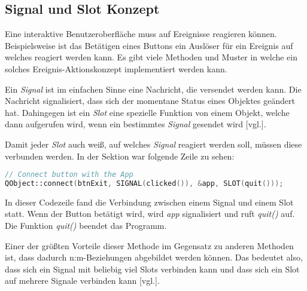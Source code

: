 \subsection{Signal und Slot Konzept}
\label{subsec:signalslot}
Eine interaktive Benutzeroberfläche muss auf
Ereignisse reagieren können. Beispielsweise ist das Betätigen eines Buttons ein Auslöser für ein
Ereignis auf welches reagiert werden kann. Es gibt viele Methoden und Muster in welche ein
solches Ereignis-Aktionskonzept implementiert werden kann.

Ein \emph{Signal} ist im einfachen Sinne eine Nachricht, die versendet werden kann. Die Nachricht
signalisiert, dass sich der momentane Status eines Objektes geändert hat. Dahingegen ist ein
\emph{Slot} eine spezielle Funktion von einem Objekt, welche dann aufgerufen wird, wenn ein
bestimmtes \emph{Signal} gesendet wird \cite{GettingStartedQt}[vgl.].

Damit jeder \emph{Slot} auch weiß, auf welches \emph{Signal} reagiert werden soll, müssen diese verbunden werden. In der Sektion \emph{} war
folgende Zeile zu sehen:
\newpage
\begin{lstlisting}[language=C++, caption=Signal- und Slot-Beispiel, label=lst:SignalSlotBeispiel]
// Connect button with the App
QObject::connect(btnExit, SIGNAL(clicked()), &app, SLOT(quit()));

\end{lstlisting}

In dieser Codezeile fand die Verbindung zwischen einem Signal und einem Slot statt.
Wenn der Button betätigt wird, wird \emph{app} signalisiert und ruft \emph{quit()} auf. Die
Funktion \emph{quit()} beendet das Programm.

Einer der größten Vorteile dieser Methode im Gegensatz zu anderen Methoden ist, dass dadurch
n:m-Beziehungen abgebildet werden können. Das bedeutet also, dass sich ein Signal mit
beliebig viel Slots verbinden kann und dass sich ein Slot auf mehrere Signale verbinden kann
\cite{SignalSlotMechanismus}[vgl.].